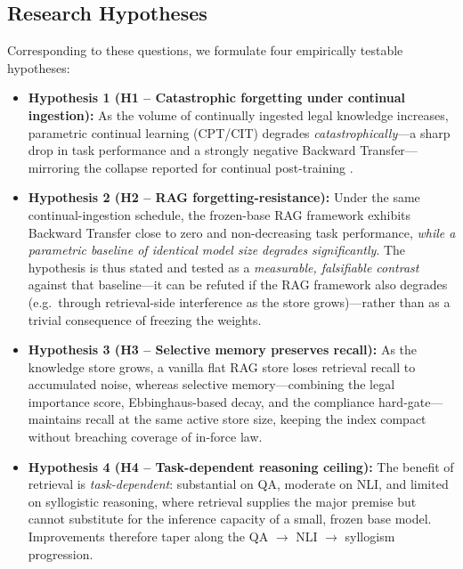 \subsection{Research Hypotheses}
Corresponding to these questions, we formulate four empirically testable hypotheses:
\begin{itemize}
    \item \textbf{Hypothesis 1 (H1 -- Catastrophic forgetting under continual ingestion):} As the volume of continually ingested legal knowledge increases, parametric continual learning (CPT/CIT) degrades \emph{catastrophically}---a sharp drop in task performance and a strongly negative Backward Transfer---mirroring the collapse reported for continual post-training \parencite{su2026retrievablegradientscontinualposttraining}.
    \item \textbf{Hypothesis 2 (H2 -- RAG forgetting-resistance):} Under the same continual-ingestion schedule, the frozen-base RAG framework exhibits Backward Transfer close to zero and non-decreasing task performance, \emph{while a parametric baseline of identical model size degrades significantly}. The hypothesis is thus stated and tested as a \emph{measurable, falsifiable contrast} against that baseline---it can be refuted if the RAG framework also degrades (e.g.\ through retrieval-side interference as the store grows)---rather than as a trivial consequence of freezing the weights.
    \item \textbf{Hypothesis 3 (H3 -- Selective memory preserves recall):} As the knowledge store grows, a vanilla flat RAG store loses retrieval recall to accumulated noise, whereas selective memory---combining the legal importance score, Ebbinghaus-based decay, and the compliance hard-gate---maintains recall at the same active store size, keeping the index compact without breaching coverage of in-force law.
    \item \textbf{Hypothesis 4 (H4 -- Task-dependent reasoning ceiling):} The benefit of retrieval is \emph{task-dependent}: substantial on QA, moderate on NLI, and limited on syllogistic reasoning, where retrieval supplies the major premise but cannot substitute for the inference capacity of a small, frozen base model. Improvements therefore taper along the QA $\rightarrow$ NLI $\rightarrow$ syllogism progression.
\end{itemize}
